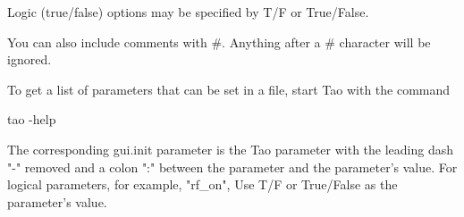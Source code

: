 Logic (true/false) options may be specified by T/F or True/False.

You can also include comments with \#.  Anything after a \# character will be ignored.

To get a list of parameters that can be set in a  file, start Tao with the command
\begin{example}
  tao -help
\end{example}
The corresponding gui.init parameter is the Tao parameter with the leading dash "-" removed and a
colon ":" between the parameter and the parameter's value. For logical parameters, for example,
"rf_on", Use T/F or True/False as the parameter's value.

